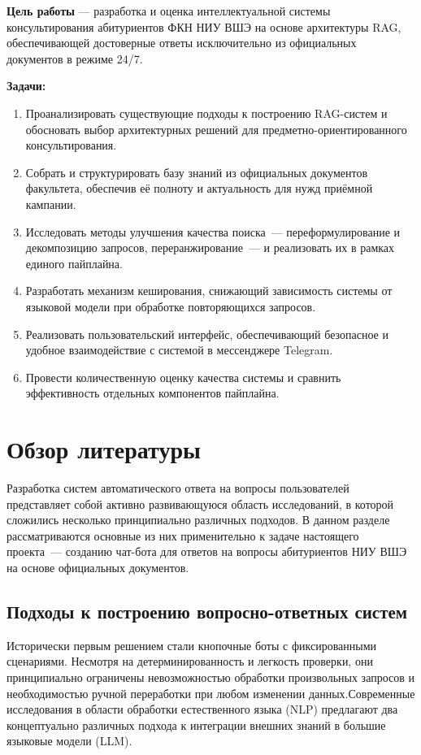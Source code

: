 \documentclass{article}
\begin{document}
\noindent\textbf{Цель работы} --- разработка и оценка интеллектуальной системы
консультирования абитуриентов ФКН НИУ ВШЭ на основе архитектуры RAG,
обеспечивающей достоверные ответы исключительно из официальных документов
в режиме 24/7.

\noindent\textbf{Задачи:}
\begin{enumerate}
    \item Проанализировать существующие подходы к построению RAG-систем и
    обосновать выбор архитектурных решений для предметно-ориентированного
    консультирования.

    \item Собрать и структурировать базу знаний из официальных документов
    факультета, обеспечив её полноту и актуальность для нужд приёмной кампании.

    \item Исследовать методы улучшения качества поиска~--- переформулирование
    и декомпозицию запросов, переранжирование~--- и реализовать их в рамках
    единого пайплайна.

    \item Разработать механизм кеширования, снижающий зависимость системы
    от языковой модели при обработке повторяющихся запросов.

    \item Реализовать пользовательский интерфейс, обеспечивающий безопасное
    и удобное взаимодействие с системой в мессенджере Telegram.

    \item Провести количественную оценку качества системы и сравнить
    эффективность отдельных компонентов пайплайна.
\end{enumerate}


\section{Обзор литературы}
Разработка систем автоматического ответа на вопросы пользователей представляет собой активно развивающуюся область исследований, в которой сложились несколько принципиально различных подходов. В данном разделе рассматриваются основные из них применительно к задаче настоящего проекта~--- созданию чат-бота для ответов на вопросы абитуриентов НИУ ВШЭ на основе официальных документов.
\subsection{Подходы к построению вопросно-ответных систем}
Исторически первым решением стали кнопочные боты с фиксированными сценариями. Несмотря на детерминированность и легкость проверки, они принципиально ограничены невозможностью обработки произвольных запросов и необходимостью ручной переработки при любом изменении данных.Современные исследования в области обработки естественного языка (NLP) предлагают два концептуально различных подхода к интеграции внешних знаний в большие языковые модели (LLM).
\end{document}
